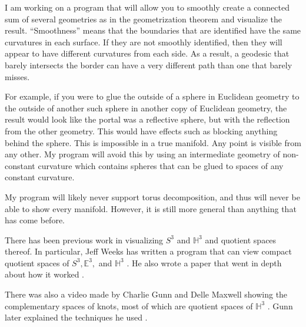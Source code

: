 \documentclass[12pt]{amsart}
\begin{document}

I am working on a program that will allow you to smoothly create a connected sum of several geometries as in the geometrization theorem and visualize the result. ``Smoothness'' means that the boundaries that are identified have the same curvatures in each surface. If they are not smoothly identified, then they will appear to have different curvatures from each side. As a result, a geodesic that barely intersects the border can have a very different path than one that barely misses.

For example, if you were to glue the outside of a sphere in Euclidean geometry to the outside of another such sphere in another copy of Euclidean geometry, the result would look like the portal was a reflective sphere, but with the reflection from the other geometry. This would have effects such as blocking anything behind the sphere. This is impossible in a true manifold. Any point is visible from any other. My program will avoid this by using an intermediate geometry of non-constant curvature which contains spheres that can be glued to spaces of any constant curvature.

My program will likely never support torus decomposition, and thus will never be able to show every manifold. However, it is still more general than anything that has come before.






There has been previous work in visualizing $S^3$ and $\mathbb{H}^3$ and quotient spaces thereof. In particular, Jeff Weeks has written a program that can view compact quotient spaces of $S^3, \mathbb{E}^3,$ and $\mathbb{H}^3$ \cite{CurvedSpaces}. He also wrote a paper that went in depth about how it worked \cite{CurvedSpacesPaper}.

There was also a video made by Charlie Gunn and Delle Maxwell showing the complementary spaces of knots, most of which are quotient spaces of $\mathbb{H}^3$ \cite{NotKnot}. Gunn later explained the techniques he used \cite{CharlieGunn} \cite{CharlieGunn2}.
\end{document}

